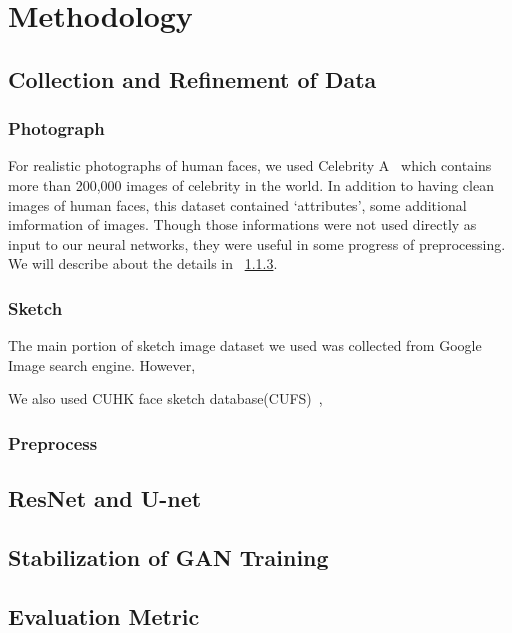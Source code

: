 \chapter{Methodology}\label{Ch:Methodology}


\section{Collection and Refinement of Data}

\subsection{Photograph}

For realistic photographs of human faces, we used Celebrity A~\cite{liu2015faceattributes} which contains more than 200,000 images of celebrity in the world. In addition to having clean images of human faces, this dataset contained `attributes', some additional imformation of images. Though those informations were not used directly as input to our neural networks, they were useful in some progress of preprocessing. We will describe about the details in ~\ref{preprocess}.

\subsection{Sketch}

The main portion of sketch image dataset we used was collected from Google Image search engine. However, 


We also used CUHK face sketch database(CUFS)~\cite{CUHK_faces}, 

\subsection{Preprocess}\label{preprocess}


\section{ResNet and U-net}


\section{Stabilization of GAN Training}


\section{Evaluation Metric}

\endinput
